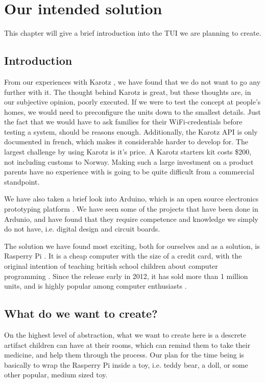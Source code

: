 
\chapter{Our intended solution}
\label{chp:our-solution}

This chapter will give a brief introduction into the TUI we are planning to create. 

\section{Introduction}
\label{sec:our-solution-introduction}
From our experiences with Karotz \cite{karotz}, we have found that we do not want to go any further with it. The thought behind Karotz is great, but these thoughts are, in our subjective opinion, poorly executed. If we were to test the concept at people's homes, we would need to preconfigure the units down to the smallest details. Just the fact that we would have to ask families for their WiFi-credentials before testing a system, should be reasons enough.
Additionally, the Karotz API is only documented in french, which makes it considerable harder to develop for. The largest challenge by using Karotz is it's price. A Karotz starters kit costs \$200, not including customs to Norway. Making such a large investment on a product parents have no experience with is going to be quite difficult from a commercial standpoint.  



We have also taken a brief look into Arduino, which is an open source electronics prototyping platform \cite{arduino}. We have seen some of the projects that have been done in Ardunio, and have found that they require competence and knowledge we simply do not have, i.e. digital design and circuit boards. 


The solution we have found most exciting, both for ourselves and as a solution, is Rasperry Pi \cite{rasperrypi}. It is a cheap computer with the size of a credit card, with the original intention of teaching british school children about computer programming \cite{rasperrypi-about}. Since the release early in 2012, it has sold more than 1 million units, and is highly popular among computer enthusiasts \cite{pimillion}. 


\section{What do we want to create?}
On the highest level of abstraction, what we want to create here is a descrete artifact children can have at their rooms, which can remind them to take their medicine, and help them through the process. Our plan for the time being is basically to wrap the Rasperry Pi inside a toy, i.e. teddy bear, a doll, or some other popular, medium sized toy.

